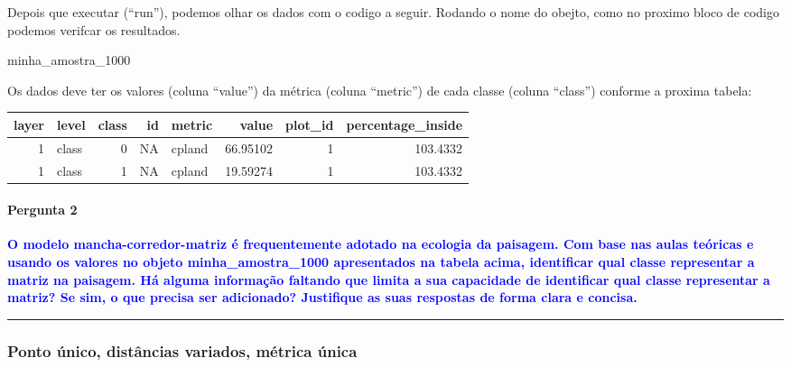 \documentclass[
]{article}
\newenvironment{Shaded}{\begin{snugshade}}{\end{snugshade}}
\newcommand{\NormalTok}[1]{#1}
\begin{document}
Depois que executar (``run''), podemos olhar os dados com o codigo a seguir.
Rodando o nome do obejto, como no proximo bloco de codigo podemos verifcar os resultados.

\begin{Shaded}
\begin{Highlighting}[]
\NormalTok{minha\_amostra\_1000}
\end{Highlighting}
\end{Shaded}

Os dados deve ter os valores (coluna ``value'') da métrica (coluna ``metric'') de cada classe (coluna ``class'') conforme a proxima tabela:

\begin{table}[!h]
\centering
\begin{tabular}[t]{r|l|r|r|l|r|r|r}
\hline
layer & level & class & id & metric & value & plot\_id & percentage\_inside\\
\hline
1 & class & 0 & NA & cpland & 66.95102 & 1 & 103.4332\\
\hline
1 & class & 1 & NA & cpland & 19.59274 & 1 & 103.4332\\
\hline
\end{tabular}
\end{table}

\hypertarget{pergunta-2-1}{%
\paragraph{Pergunta 2}\label{pergunta-2-1}}

\textcolor{blue}{\textbf{O modelo mancha-corredor-matriz é frequentemente adotado na ecologia da paisagem. Com base nas aulas teóricas e usando os valores no objeto minha\_amostra\_1000 apresentados na tabela acima, identificar qual classe representar a matriz na paisagem. Há alguma informação faltando que limita a sua capacidade de identificar qual classe representar a matriz? Se sim, o que precisa ser adicionado? Justifique as suas respostas de forma clara e concisa.}}

\begin{center}\rule{0.5\linewidth}{0.5pt}\end{center}

\newpage

\hypertarget{ponto-uxfanico-distuxe2ncias-variados-muxe9trica-uxfanica}{%
\subsubsection{Ponto único, distâncias variados, métrica única}\label{ponto-uxfanico-distuxe2ncias-variados-muxe9trica-uxfanica}}
\end{document}
